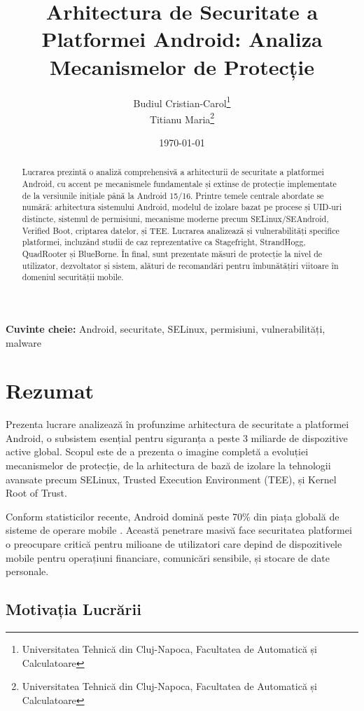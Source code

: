 \documentclass[11pt,a4paper,twocolumn]{article}
\title{Arhitectura de Securitate a Platformei Android: Analiza Mecanismelor de Protecție}
\author{%
    Budiul Cristian-Carol\footnote{Universitatea Tehnică din Cluj-Napoca, Facultatea de Automatică și Calculatoare}\\[0.3cm]
    Titianu Maria\footnote{Universitatea Tehnică din Cluj-Napoca, Facultatea de Automatică și Calculatoare}\\[0.3cm]
}
\date{\today}
\theoremstyle{definition}
\theoremstyle{plain}
\theoremstyle{remark}
\begin{document}
\maketitle

\begin{abstract}
Lucrarea prezintă o analiză comprehensivă a arhitecturii de securitate a platformei Android, 
cu accent pe mecanismele fundamentale și extinse de protecție implementate de la versiunile 
inițiale până la Android 15/16. Printre temele centrale abordate se numără: arhitectura 
sistemului Android, modelul de izolare bazat pe procese și UID-uri distincte, sistemul de 
permisiuni, mecanisme moderne precum SELinux/SEAndroid, Verified Boot, criptarea datelor, 
și TEE. Lucrarea analizează și vulnerabilități specifice platformei, incluzând studii de 
caz reprezentative ca Stagefright, StrandHogg, QuadRooter și BlueBorne. În final, sunt 
prezentate măsuri de protecție la nivel de utilizator, dezvoltator și sistem, alături de 
recomandări pentru îmbunătățiri viitoare în domeniul securității mobile.
\end{abstract}

\textbf{Cuvinte cheie:} Android, securitate, SELinux, permisiuni, vulnerabilități, malware

\section{Rezumat}

Prezenta lucrare analizează în profunzime arhitectura de securitate a platformei Android, 
o subsistem esențial pentru siguranța a peste 3 miliarde de dispozitive active global. 
Scopul este de a prezenta o imagine completă a evoluției mecanismelor de protecție, de la 
arhitectura de bază de izolare la tehnologii avansate precum SELinux, Trusted Execution 
Environment (TEE), și Kernel Root of Trust.

Conform statisticilor recente, Android domină peste 70\% din piața globală de sisteme 
de operare mobile \cite{android_stats}. Această penetrare masivă face securitatea 
platformei o preocupare critică pentru milioane de utilizatori care depind de dispozitivele 
mobile pentru operațiuni financiare, comunicări sensibile, și stocare de date personale.

\subsection{Motivația Lucrării}
\end{document}
